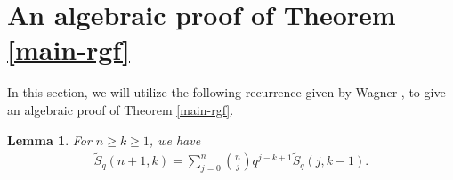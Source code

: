 \documentclass[12pt]{amsart}
\numberwithin{equation}{section}
\theoremstyle{plain}
\newtheorem{lemma}[theorem]{Lemma}
\theoremstyle{definition}
\begin{document}
\section{An algebraic proof of Theorem \ref{main-rgf} }\label{sec:algebra}

 In this section, we will utilize the following recurrence given by Wagner \cite{Wa1996}, to give an algebraic proof of Theorem \ref{main-rgf}.

 \begin{lemma}
 For $n \geq k \geq 1$, we have
 \begin{align}

   \widetilde{S}_q(n+1,k)=\sum_{j=0}^n {\binom{n}{j}} q^{j-k+1} \widetilde{S}_q(j,k-1).\label{recur2}
 \end{align}
 \end{lemma}
\end{document}
